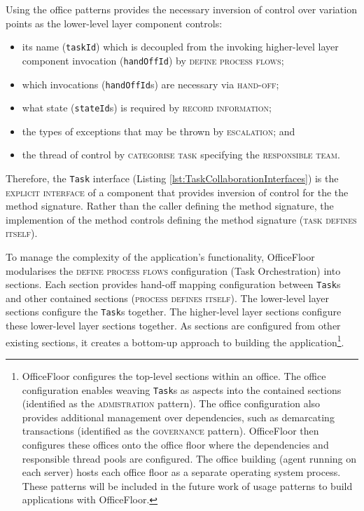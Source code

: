 \documentclass[prodmode]{style/acmlarge}
\begin{document}
Using the office patterns provides the necessary inversion of control over
variation points as the lower-level layer component controls:
\begin{itemize}
  \item its name (\texttt{taskId}) which is decoupled from the invoking higher-level layer component invocation (\texttt{handOffId}) by \textsc{define process flows};
  \item which invocations (\texttt{handOffId}s) are necessary via \textsc{hand-off};
  \item what state (\texttt{stateId}s) is required by \textsc{record information};
  \item the types of exceptions that may be thrown by \textsc{escalation}; and
  \item the thread of control by \textsc{categorise task} specifying the \textsc{responsible team}.
\end{itemize}

Therefore, the \texttt{Task} interface (Listing
\ref{lst:TaskCollaborationInterfaces}) is the \textsc{explicit interface} of a
component that provides inversion of control for the the method signature. 
Rather than the caller defining the method signature, the implemention of the
method controls defining the method signature (\textsc{task defines itself}).

To manage the complexity of the application's functionality, OfficeFloor
modularises the \textsc{define process flows} configuration (Task Orchestration)
into sections.  Each section provides hand-off mapping configuration between
\texttt{Task}s and other contained sections (\textsc{process defines itself}).
The lower-level layer sections configure the \texttt{Task}s together.  The
higher-level layer sections configure these lower-level layer sections together.
As sections are configured from other existing sections, it creates a bottom-up
approach to building the application\footnote{OfficeFloor configures the
top-level sections within an office.  The office configuration enables weaving
\texttt{Task}s as aspects into the contained sections (identified as the
\textsc{admistration} pattern).  The office configuration also provides
additional management over dependencies, such as demarcating transactions
(identified as the \textsc{governance} pattern). OfficeFloor then configures
these offices onto the office floor where the dependencies and responsible
thread pools are configured.  The office building (agent running on each server)
hosts each office floor as a separate operating system process.  These patterns
will be included in the future work of usage patterns to build applications with
OfficeFloor.}.
\end{document}
